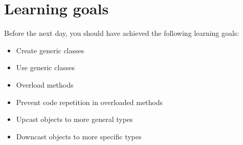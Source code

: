 \documentclass{article}
\begin{document}
\section*{Learning goals}
\label{sec:learning-goals}

Before the next day, you should have achieved the following learning
goals: 

\begin{itemize}
\item Create generic classes
\item Use generic classes
\item Overload methods
\item Prevent code repetition in overloaded methods
\item Upcast objects to more general types
\item Downcast objects to more specific types
\end{itemize}





\end{document}
